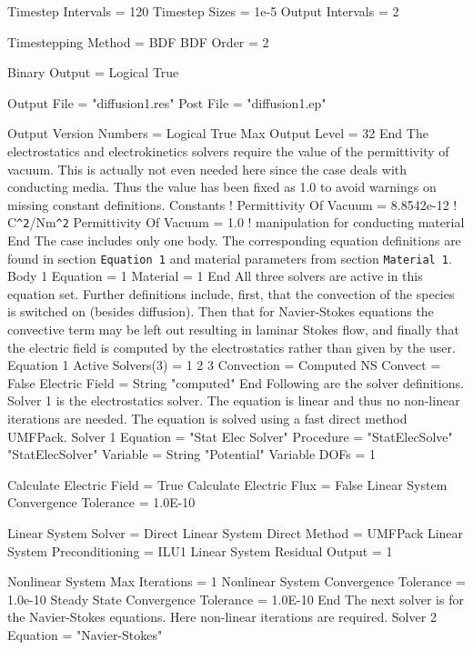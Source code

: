   Timestep Intervals = 120
  Timestep Sizes = 1e-5  
  Output Intervals = 2

  Timestepping Method = BDF
  BDF Order = 2

  Binary Output = Logical True

  Output File = "diffusion1.res"
  Post File = "diffusion1.ep"

  Output Version Numbers = Logical True
  Max Output Level = 32
End
\ttend
%
The electrostatics and electrokinetics solvers require the value of
the permittivity of vacuum. This is actually not even needed here
since the case deals with conducting media. Thus the value has been
fixed as 1.0 to avoid warnings on missing constant definitions.
%
\ttbegin
Constants
!  Permittivity Of Vacuum = 8.8542e-12  ! C\verb|^2|/Nm\verb*|^2|
  Permittivity Of Vacuum = 1.0 ! manipulation for conducting material
End
\ttend
%
The case includes only one body. The corresponding equation definitions are
found in section \texttt{Equation 1} and material parameters from
section \texttt{Material 1}.
%
\ttbegin
Body 1
  Equation = 1
  Material = 1
End
\ttend
%
All three solvers are active in this equation set. Further definitions
include, first, that the convection of the species is switched on
(besides diffusion). Then that for Navier-Stokes equations the
convective term may be left out resulting in laminar Stokes flow, and
finally that the electric field is computed by the electrostatics
rather than given by the user.
%
\ttbegin
Equation 1
  Active Solvers(3) = 1 2 3
  Convection = Computed
  NS Convect = False
  Electric Field = String "computed"
End
\ttend
%
Following are the solver definitions. Solver 1 is the electrostatics
solver. The equation is linear and thus no non-linear iterations are
needed. The equation is solved using a fast direct method UMFPack.
%
\ttbegin
Solver 1  
  Equation = "Stat Elec Solver"
  Procedure = "StatElecSolve" "StatElecSolver"
  Variable = String "Potential"
  Variable DOFs = 1

  Calculate Electric Field = True
  Calculate Electric Flux = False
  Linear System Convergence Tolerance = 1.0E-10

  Linear System Solver = Direct
  Linear System Direct Method = UMFPack 
  Linear System Preconditioning = ILU1
  Linear System Residual Output = 1

  Nonlinear System Max Iterations = 1
  Nonlinear System Convergence Tolerance = 1.0e-10
  Steady State Convergence Tolerance =  1.0E-10
End
\ttend
%
The next solver is for the Navier-Stokes equations. Here non-linear
iterations are required.
\ttbegin
Solver 2
  Equation = "Navier-Stokes"

